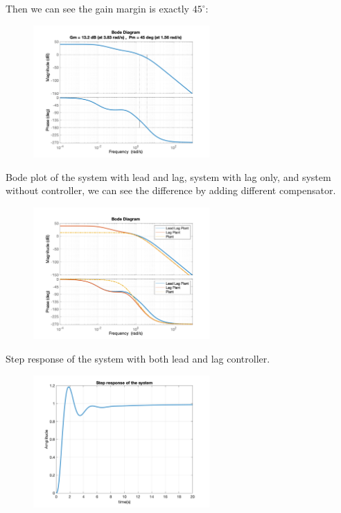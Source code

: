 \documentclass[a4paper]{article}
\begin{document}
\noindent Then we can see the gain margin is exactly $45^\circ$:
\begin{figure}[H]
\centering
\includegraphics[width = 0.6\textwidth]{pic/5.png}
\end{figure}
\noindent Bode plot of the system with lead and lag, system with lag only, and system without controller, we can see the difference by adding different compensator.
\begin{figure}[H]
\centering
\includegraphics[width = 0.6\textwidth]{pic/3.png}
\end{figure}
Step response of the system with both lead and lag controller.
\begin{figure}[H]
\centering
\includegraphics[width = 0.6\textwidth]{pic/4.png}
\end{figure}
\end{document}

